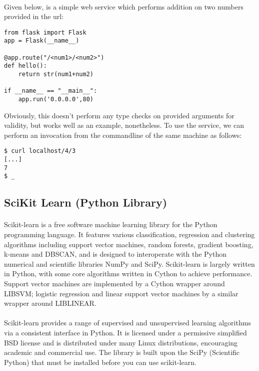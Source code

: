 \paragraph{}
Given below, is a simple web service which performs addition on two numbers provided in the url:
\begin{verbatim}
from flask import Flask
app = Flask(__name__)

@app.route("/<num1>/<num2>")
def hello():
    return str(num1+num2)

if __name__ == "__main__":
    app.run('0.0.0.0',80)
\end{verbatim}
Obviously, this doesn't perform any type checks on provided arguments for validity, but works well as an example, nonetheless. To use the service, we can perform an invocation from the commandline of the same machine as follows:
\begin{verbatim}
$ curl localhost/4/3
[...]
7
$ _
\end{verbatim}

\subsection{SciKit Learn (Python Library)}
\paragraph{}
Scikit-learn is a free software machine learning library for the Python programming language. It features various classification, regression and clustering algorithms including support vector machines, random forests, gradient boosting, k-means and DBSCAN, and is designed to interoperate with the Python numerical and scientific libraries NumPy and SciPy. Scikit-learn is largely written in Python, with some core algorithms written in Cython to achieve performance. Support vector machines are implemented by a Cython wrapper around LIBSVM; logistic regression and linear support vector machines by a similar wrapper around LIBLINEAR.

\paragraph{}
Scikit-learn provides a range of supervised and unsupervised learning algorithms via a consistent interface in Python. It is licensed under a permissive simplified BSD license and is distributed under many Linux distributions, encouraging academic and commercial use. The library is built upon the SciPy (Scientific Python) that must be installed before you can use scikit-learn.
